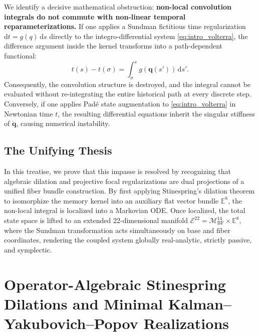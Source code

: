 \documentclass[11pt,a4paper,reqno]{article}
\theoremstyle{plain}
\theoremstyle{definition}
\theoremstyle{remark}
\numberwithin{equation}{section}
\begin{document}
We identify a decisive mathematical obstruction: \textbf{non-local convolution integrals do not commute with non-linear temporal reparameterizations.} 
If one applies a Sundman fictitious time regularization $\mathrm{d}t = g(q)\,\mathrm{d}s$ directly to the integro-differential system \eqref{eq:intro_volterra}, the difference argument inside the kernel transforms into a path-dependent functional:
\begin{equation}
  t(s) - t(\sigma) = \int_\sigma^s g(\mathbf{q}(s'))\,\mathrm{d}s'.
\end{equation}
Consequently, the convolution structure is destroyed, and the integral cannot be evaluated without re-integrating the entire historical path at every discrete step. Conversely, if one applies Pad\'{e} state augmentation to \eqref{eq:intro_volterra} in Newtonian time $t$, the resulting differential equations inherit the singular stiffness of $\dot{\mathbf{q}}$, causing numerical instability.

\subsection{The Unifying Thesis}
In this treatise, we prove that this impasse is resolved by recognizing that algebraic dilation and projective focal regularizations are dual projections of a unified fiber bundle construction. 
By first applying Stinespring's dilation theorem to isomorphize the memory kernel into an auxiliary flat vector bundle $\mathbb{E}^8$, the non-local integral is localized into a Markovian ODE. 
Once localized, the total state space is lifted to an extended 22-dimensional manifold $\mathcal{E}^{22} = \mathcal{M}_{\mathrm{BF}}^{14} \times \mathbb{E}^8$, where the Sundman transformation acts simultaneously on base and fiber coordinates, rendering the coupled system globally real-analytic, strictly passive, and symplectic.

\section{Operator-Algebraic Stinespring Dilations and Minimal Kalman--Yakubovich--Popov Realizations}
\label{sec:operator_algebraic_dilation}
\end{document}
